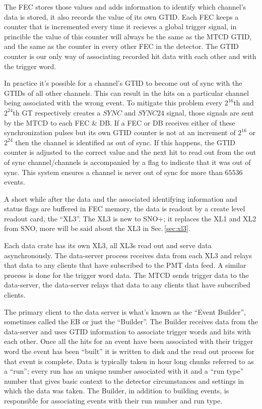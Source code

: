 The FEC stores those values and adds information to identify which
channel's data is stored, it also records the value of its own GTID\@.
Each FEC keeps a counter that is incremented every time it recieves a global
trigger signal, in princible the value of this counter will always be the same
as the MTCD GTID, and the same as the counter in every other FEC in the detector.
The GTID counter is our only way of associating recorded hit data with each other
and with the trigger word.

In practice it's possible for a channel's GTID to become out of sync with the GTIDs of
all other channels.
This can result in the hits on a particular channel being associated with
the wrong event.
To mitigate this problem every $2^{16}$th and $2^{24}$th GT respectively creates a $SYNC$ and
$SYNC24$ signal, those signals are sent by the MTCD to each FEC \& DB\@.
If a FEC or DB receives either of these synchronization pulses but its own GTID counter is not
at an increment of $2^{16}$ or $2^{24}$ then the channel is identified as out of sync.
If this happens, the GTID counter is adjusted to the correct value and the next hit to read out from the out of sync channel/channels is accompanied
by a flag to indicate that it was out of sync.
This system ensures a channel is never out of sync for more than $65536$ events.

A short while after the data and the associated identifying information and status flags are buffered
in FEC memory, the data is readout by a create level readout card,
the ``XL3''.
The XL3 is new to SNO+; it replaces the XL1 and XL2 from SNO, more will be said about the
XL3 in Sec.\,\ref{sec:xl3}.

Each data crate has its own XL3, all XL3s read out and serve data asynchronously.
The data-server process receives data from each XL3 and relays that data to
any clients that have subscribed to the PMT data feed.
A similar process is done for the trigger word data. The MTCD sends trigger data
to the data-server, the data-server relays that data to any clients that have subscribed
clients.

The primary client to the data server is what's known as the ``Event Builder'', sometimes
called the EB or just the ``Builder''. The Builder receives data from the data-server and
uses GTID information to associate trigger words and hits with each other.
Once all the hits for an event have been associated with their trigger word the event
has been ``built'' it is written to disk and the read out process for that event is complete.
Data is typically taken in hour long chunks referred to as a ``run'';
every run has an unique number associated with it and a ``run type'' number that
gives basic context to the detector circumstances and settings in which the data was taken.
The Builder, in addition to building events, is responsible for associating
events with their run number and run type.


